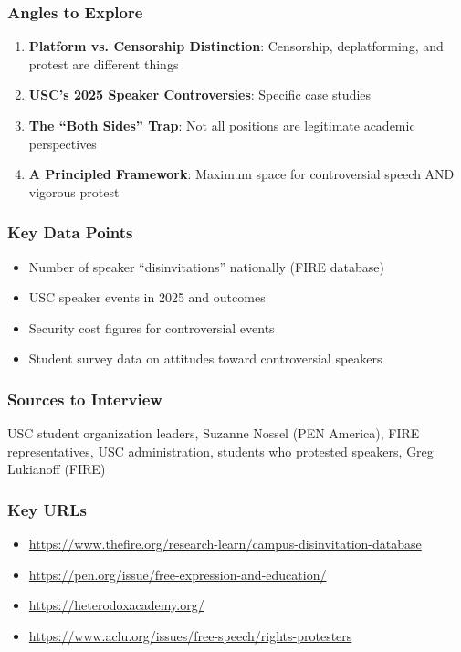\documentclass[11pt,letterpaper]{article}
\begin{document}
\subsubsection*{Angles to Explore}
\begin{enumerate}[noitemsep]
    \item \textbf{Platform vs. Censorship Distinction}: Censorship, deplatforming, and protest are different things
    \item \textbf{USC's 2025 Speaker Controversies}: Specific case studies
    \item \textbf{The ``Both Sides'' Trap}: Not all positions are legitimate academic perspectives
    \item \textbf{A Principled Framework}: Maximum space for controversial speech AND vigorous protest
\end{enumerate}

\subsubsection*{Key Data Points}
\begin{itemize}[noitemsep]
    \item Number of speaker ``disinvitations'' nationally (FIRE database)
    \item USC speaker events in 2025 and outcomes
    \item Security cost figures for controversial events
    \item Student survey data on attitudes toward controversial speakers
\end{itemize}

\subsubsection*{Sources to Interview}
USC student organization leaders, Suzanne Nossel (PEN America), FIRE representatives, USC administration, students who protested speakers, Greg Lukianoff (FIRE)

\subsubsection*{Key URLs}
\begin{itemize}[noitemsep]
    \item \url{https://www.thefire.org/research-learn/campus-disinvitation-database}
    \item \url{https://pen.org/issue/free-expression-and-education/}
    \item \url{https://heterodoxacademy.org/}
    \item \url{https://www.aclu.org/issues/free-speech/rights-protesters}
\end{itemize}
\end{document}
